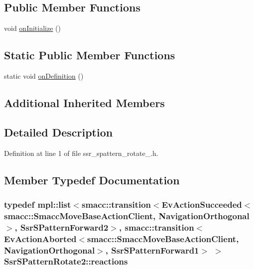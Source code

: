 \subsection*{Public Member Functions}
\begin{DoxyCompactItemize}
\item 
void \hyperlink{structSsrSPatternRotate2_acae719a6c582b769e997fd4a8f79d12a}{on\+Initialize} ()
\end{DoxyCompactItemize}
\subsection*{Static Public Member Functions}
\begin{DoxyCompactItemize}
\item 
static void \hyperlink{structSsrSPatternRotate2_acfc99af790632321111d347cd4315338}{on\+Definition} ()
\end{DoxyCompactItemize}
\subsection*{Additional Inherited Members}


\subsection{Detailed Description}


Definition at line 1 of file ssr\+\_\+spattern\+\_\+rotate\+\_.\+h.



\subsection{Member Typedef Documentation}
\subsubsection[{\texorpdfstring{reactions}{reactions}}]{\setlength{\rightskip}{0pt plus 5cm}typedef mpl\+::list$<${\bf smacc\+::transition}$<$Ev\+Action\+Succeeded$<${\bf smacc\+::\+Smacc\+Move\+Base\+Action\+Client}, {\bf Navigation\+Orthogonal}$>$, {\bf Ssr\+S\+Pattern\+Forward2}$>$, {\bf smacc\+::transition}$<$Ev\+Action\+Aborted$<${\bf smacc\+::\+Smacc\+Move\+Base\+Action\+Client}, {\bf Navigation\+Orthogonal}$>$, {\bf Ssr\+S\+Pattern\+Forward1}$>$ $>$ {\bf Ssr\+S\+Pattern\+Rotate2\+::reactions}}\hypertarget{structSsrSPatternRotate2_a5cd0e154069c145a469384000c4aebd5}{}\label{structSsrSPatternRotate2_a5cd0e154069c145a469384000c4aebd5}


